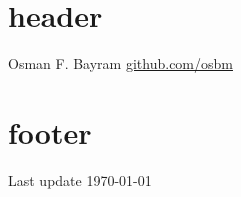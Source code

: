 \documentclass{article} %
\author{Osman Faruk Bayram}
\begin{document}
\section{header}
Osman F. Bayram
\href{http://github.com/osbm}{github.com/osbm}

\section{footer}

Last update \today
\end{document}
